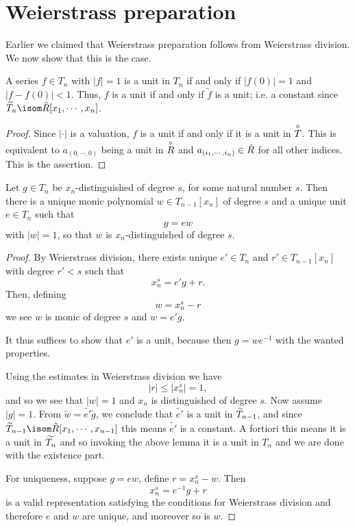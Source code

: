 \section{Weierstrass preparation}

Earlier we claimed that Weierstrass preparation follows from Weierstrass division. We now show that
this is the case.

\begin{lemma}
  A series $f \in T_n$ with $\lvert f \rvert = 1$ is a unit in $T_n$ if and only if $\lvert f (0) \rvert = 1$
  and $\lvert f - f(0) \rvert < 1$. Thus, $f$ is a unit if and only if $\tilde{f}$ is a unit;
  i.e. a constant since $\res{T}_{n} \isom \tilde{R}[x_1, \cdots, x_{n}]$.
\end{lemma}

\begin{proof}
  Since $\lvert \cdot \rvert$ is a valuation, $f$ is a unit if and only if it is a unit in $\overset{\circ}{T}$.
  This is equivalent to $a_{(0, \cdots, 0)}$ being a unit in $\overset{\circ}{R}$ and $a_{(i_1,\cdots, i_n)} \in \check{R}$
  for all other indices. This is the assertion.
\end{proof}


\begin{theorem}
  Let $g \in T_n$ be $x_n$-distinguished of degree $s$, for some natural number $s$. Then there is a
  unique monic polynomial $w \in T_{n-1}[x_n]$ of degree $s$ and a unique unit $e \in T_n$ such that
  \[
    g = e w
  \]
  with $\lvert w \rvert = 1$, so that $w$ is $x_n$-distinguished of degree $s$.
\end{theorem}

\begin{proof}
  By Weierstrass division, there exists unique $e' \in T_n$ and $r' \in T_{n-1} [x_n]$ with degree $r' < s$
  such that
  \[
    x_n^s = e' g + r.
  \]
  Then, defining
  \[
    w = x^s_n - r
  \]
  we see $w$ is monic of degree $s$ and $w = e' g$.

  It thus suffices to show that $e'$ is a unit, because then $g = w e^{-1}$ with the wanted properties.

  Using the estimates in Weierstrass division we have
  \[
    \lvert r \rvert \leq \lvert x_n^s \rvert = 1,
  \]
  and so we see that $\lvert w \rvert = 1$ and $x_n$ is distinguished of degree $s$.
  Now assume $\lvert g \rvert = 1$. From $\tilde{w} = \tilde{e'} \tilde{g}$, we conclude that $\tilde{e'}$
  is a unit in $\widetilde{T}_{n-1}$, and since $\res{T}_{n-1} \isom \tilde{R}[x_1, \cdots, x_{n-1}]$ this means
  $\tilde{e'}$ is a constant.
  A fortiori this means it is a unit in $\widetilde{T_n}$ and so invoking the above lemma it is a unit in $T_n$
  and we are done with the existence part.

  For uniqueness, suppose $g = e w$, define $r = x^s_n - w$. Then
  \[
    x_n^s = e^{-1} g + r
  \]
  is a valid representation satisfying the conditions for Weierstrass division and therefore $e$ and
  $w$ are unique, and moreover so is $w$.
\end{proof}



